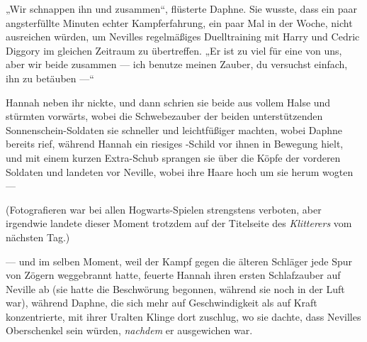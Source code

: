 \later

„Wir schnappen ihn und zusammen“, flüsterte Daphne. Sie wusste, dass ein paar angsterfüllte Minuten echter Kampferfahrung, ein paar Mal in der Woche, nicht ausreichen würden, um Nevilles regelmäßiges Duelltraining mit Harry und Cedric Diggory im gleichen Zeitraum zu übertreffen.
„Er ist zu viel für eine von uns, aber wir beide zusammen — ich benutze meinen Zauber, du versuchst einfach, ihn zu betäuben —“

Hannah neben ihr nickte, und dann schrien sie beide aus vollem Halse und stürmten vorwärts, wobei die Schwebezauber der beiden unterstützenden Sonnenschein-Soldaten sie schneller und leichtfüßiger machten, wobei Daphne bereits  rief, während Hannah ein riesiges -Schild vor ihnen in Bewegung hielt, und mit einem kurzen Extra-Schub sprangen sie über die Köpfe der vorderen Soldaten und landeten vor Neville, wobei ihre Haare hoch um sie herum wogten —

(Fotografieren war bei allen Hogwarts-Spielen strengstens verboten, aber irgendwie landete dieser Moment trotzdem auf der Titelseite des \emph{Klitterers} vom nächsten Tag.)

— und im selben Moment, weil der Kampf gegen die älteren Schläger jede Spur von Zögern weggebrannt hatte, feuerte Hannah ihren ersten Schlafzauber auf Neville ab (sie hatte die Beschwörung begonnen, während sie noch in der Luft war), während Daphne, die sich mehr auf Geschwindigkeit als auf Kraft konzentrierte, mit ihrer Uralten Klinge dort zuschlug, wo sie dachte, dass Nevilles Oberschenkel sein würden, \emph{nachdem} er ausgewichen war.

